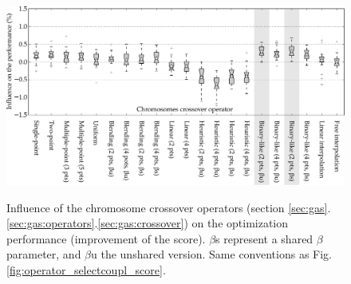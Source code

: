\documentclass{ametsoc}
\begin{document}
\begin{figure}[t]
	\begin{center}
		\noindent\includegraphics[width=39pc,angle=0]{fig05.pdf}\\
	\end{center}
	\caption{Influence of the chromosome crossover operators (section \ref{sec:gas}.\ref{sec:gas:operators}.\ref{sec:gas:crossover}) on the optimization performance (improvement of the score).  $\beta$s represent a shared $\beta$ parameter, and $\beta$u the unshared version. Same conventions as Fig. \ref{fig:operator_selectcoupl_score}.}
	\label{fig:operator_crossover_score}
\end{figure}
\end{document}
